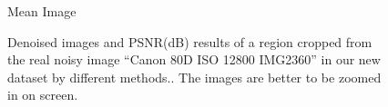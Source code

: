 \begin{figure}
{\begin{minipage}[t]{0.19\textwidth}
{\footnotesize Mean Image}
\end{minipage}
}  
    \caption{Denoised images and PSNR(dB) results of a region cropped from the real noisy image ``Canon 80D ISO 12800 IMG2360'' in our new dataset by different methods.. The images are better to be zoomed in on screen.}
    \label{fig3-19}
\end{figure}

\begin{figure}
    \centering
{}
\end{figure}
